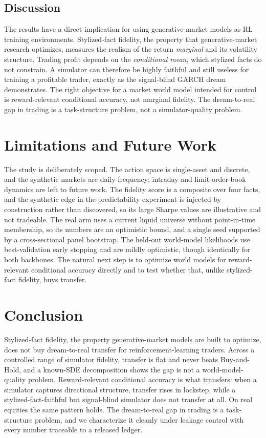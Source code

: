 \documentclass[conference]{IEEEtran}
\begin{document}
\subsection{Discussion}
The results have a direct implication for using generative-market models as RL training environments. Stylized-fact fidelity, the property that generative-market research optimizes, measures the realism of the return \emph{marginal} and its volatility structure. Trading profit depends on the \emph{conditional mean}, which stylized facts do not constrain. A simulator can therefore be highly faithful and still useless for training a profitable trader, exactly as the signal-blind GARCH dream demonstrates. The right objective for a market world model intended for control is reward-relevant conditional accuracy, not marginal fidelity. The dream-to-real gap in trading is a task-structure problem, not a simulator-quality problem.

\section{Limitations and Future Work}
The study is deliberately scoped. The action space is single-asset and discrete, and the synthetic markets are daily-frequency; intraday and limit-order-book dynamics are left to future work. The fidelity score is a composite over four facts, and the synthetic edge in the predictability experiment is injected by construction rather than discovered, so its large Sharpe values are illustrative and not tradeable. The real arm uses a current liquid universe without point-in-time membership, so its numbers are an optimistic bound, and a single seed supported by a cross-sectional panel bootstrap. The held-out world-model likelihoods use best-validation early stopping and are mildly optimistic, though identically for both backbones. The natural next step is to optimize world models for reward-relevant conditional accuracy directly and to test whether that, unlike stylized-fact fidelity, buys transfer.

\section{Conclusion}
Stylized-fact fidelity, the property generative-market models are built to optimize, does not buy dream-to-real transfer for reinforcement-learning traders. Across a controlled range of simulator fidelity, transfer is flat and never beats Buy-and-Hold, and a known-SDE decomposition shows the gap is not a world-model-quality problem. Reward-relevant conditional accuracy is what transfers: when a simulator captures directional structure, transfer rises in lockstep, while a stylized-fact-faithful but signal-blind simulator does not transfer at all. On real equities the same pattern holds. The dream-to-real gap in trading is a task-structure problem, and we characterize it cleanly under leakage control with every number traceable to a released ledger.
\end{document}
